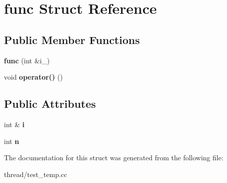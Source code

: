 \hypertarget{structfunc}{}\section{func Struct Reference}
\label{structfunc}
\subsection*{Public Member Functions}
\begin{DoxyCompactItemize}
\item 
\mbox{\label{structfunc_a6801d59dec3f95f3f7e2d9505212f144}} 
{\bfseries func} (int \&i\+\_\+)
\item 
\mbox{\label{structfunc_ae6878437e9e8405fe4f96dd798ef835d}} 
void {\bfseries operator()} ()
\end{DoxyCompactItemize}
\subsection*{Public Attributes}
\begin{DoxyCompactItemize}
\item 
\mbox{\label{structfunc_afe95e62710d2ce5ca8fa9de4fd912a9d}} 
int \& {\bfseries i}
\item 
\mbox{\label{structfunc_a4861931814274b32bc1267cd4999a578}} 
int {\bfseries n}
\end{DoxyCompactItemize}


The documentation for this struct was generated from the following file\+:\begin{DoxyCompactItemize}
\item 
thread/test\+\_\+temp.\+cc\end{DoxyCompactItemize}
